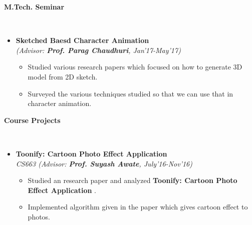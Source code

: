 \documentclass[a4paper,10pt]{article}
\newcommand{\isep}{-2 pt}
\newcommand{\lsep}{-0.5cm}
\newcommand{\resheading}[1]{{\small \colorbox{mygrey}{\begin{minipage}{0.975\textwidth}{\textbf{#1 \vphantom{p\^{E}}}}\end{minipage}}}}
\begin{document}
\resheading{\textbf{\large M.Tech. Seminar} }\\[\lsep]
\begin{itemize}
\item \textbf{ Sketched Baesd Character Animation
} \\
 \emph{(Advisor: \textbf{Prof. Parag Chaudhuri}, Jan’17-May’17)} \\[-0.6cm]
	\begin{itemize}\itemsep \isep
	\item Studied various research papers which focused on how to generate 3D model from 2D sketch.
 	\item Surveyed  the various  techniques studied  so that we can use that in character animation.

	\end{itemize}
\end{itemize}





\resheading{\textbf{\large Course Projects}}\\[\lsep]

\begin{itemize}
\item \textbf{Toonify: Cartoon Photo Effect Application} \\
\emph{	CS663 (Advisor: \textbf{Prof. Suyash Awate}, July'16-Nov'16)}\\[-0.6cm]
      \begin{itemize}\itemsep \isep
	    \item Studied an research paper and analyzed  {\bf Toonify: Cartoon Photo Effect Application} .
		\item Implemented algorithm given in the paper which gives cartoon effect to photos.
      \end{itemize}
\end{itemize}
\end{document}

